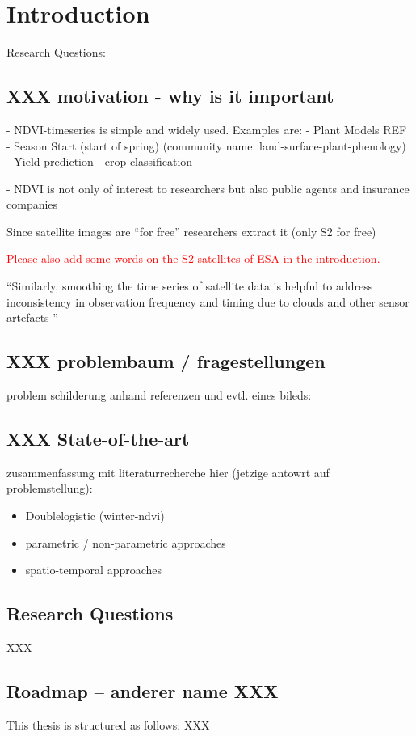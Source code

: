 \chapter{Introduction}

Research Questions:













\section{XXX motivation - why is it important}{
    - NDVI-timeseries is simple and widely used. 
        Examples are: 
            - Plant Models REF
            - Season Start (start of spring) (community name: land-surface-plant-phenology)
            - Yield prediction
            - crop classification
    
    - NDVI is not only of interest to researchers but also public agents and insurance companies
    
    Since satellite images are ``for free'' researchers extract it (only S2 for free)
    
    \textcolor{red}{Please also add some words on the S2 satellites of ESA in the introduction.} 

    ``Similarly, smoothing the time series of satellite data is helpful to address inconsistency in observation frequency and timing due to clouds and other sensor artefacts \cite{skakunWinterWheatYield2019}''
}


\section{XXX problembaum / fragestellungen}{
    problem schilderung anhand referenzen und evtl. eines bileds:
}



\section{XXX State-of-the-art}{
    zusammenfassung mit literaturrecherche hier (jetzige antowrt auf problemstellung):
    \begin{itemize}
        \item Doublelogistic (winter-ndvi)
        \item parametric / non-parametric approaches
        \item spatio-temporal approaches
    \end{itemize}
}

\section{Research Questions}
XXX

\section{Roadmap -- anderer name XXX}{
    This thesis is structured as follows: XXX
}







